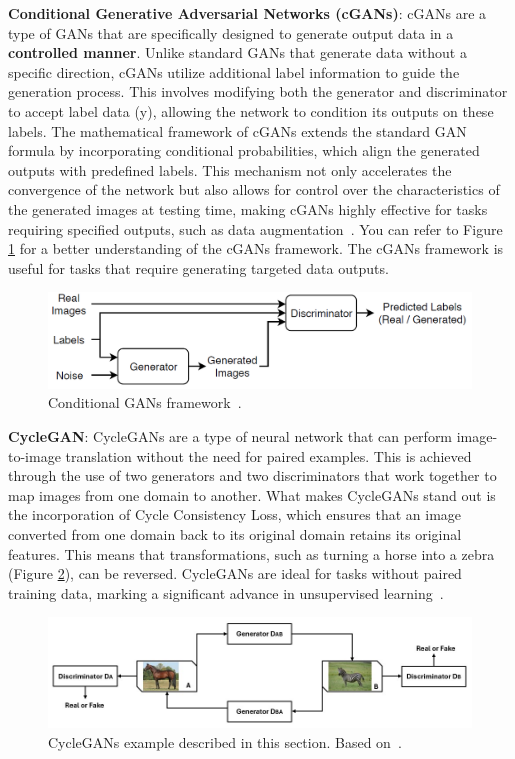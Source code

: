 \textbf{Conditional Generative Adversarial Networks (cGANs)}: cGANs are a type of GANs that are specifically designed to generate output data in a \textbf{controlled manner}. Unlike standard GANs that generate data without a specific direction, cGANs utilize additional label information to guide the generation process. This involves modifying both the generator and discriminator to accept label data (y), allowing the network to condition its outputs on these labels. The mathematical framework of cGANs extends the standard GAN formula by incorporating conditional probabilities, which align the generated outputs with predefined labels. This mechanism not only accelerates the convergence of the network but also allows for control over the characteristics of the generated images at testing time, making cGANs highly effective for tasks requiring specified outputs, such as data augmentation~\cite{cGANs}. You can refer to Figure \ref{fig:cGANsFramework} for a better understanding of the cGANs framework. The cGANs framework is useful for tasks that require generating targeted data outputs.

\begin{figure}[!htb]
    \centering
    \includegraphics[scale=0.35]{Images/cgan-diagram.png}
    \caption{Conditional GANs framework~\cite{cGANs}.}
    \label{fig:cGANsFramework}
\end{figure}

\textbf{CycleGAN}: CycleGANs are a type of neural network that can perform image-to-image translation without the need for paired examples. This is achieved through the use of two generators and two discriminators that work together to map images from one domain to another. What makes CycleGANs stand out is the incorporation of Cycle Consistency Loss, which ensures that an image converted from one domain back to its original domain retains its original features. This means that transformations, such as turning a horse into a zebra (Figure \ref{fig:cycleGANsExample}), can be reversed. CycleGANs are ideal for tasks without paired training data, marking a significant advance in unsupervised learning~\cite{cycleGANs}.

\begin{figure}[!htb]
    \centering
    \includegraphics[scale=0.62]{Images/cycleGANexample.jpg}
    \caption{CycleGANs example described in this section. Based on~\cite{cycleGANs}.}
    \label{fig:cycleGANsExample}
\end{figure}

